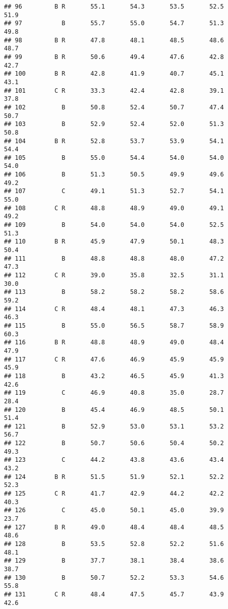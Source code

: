 \documentclass[]{article}
\begin{document}
\begin{verbatim}
## 96         B R       55.1       54.3       53.5       52.5       51.9
## 97           B       55.7       55.0       54.7       51.3       49.8
## 98         B R       47.8       48.1       48.5       48.6       48.7
## 99         B R       50.6       49.4       47.6       42.8       42.7
## 100        B R       42.8       41.9       40.7       45.1       43.1
## 101        C R       33.3       42.4       42.8       39.1       37.8
## 102          B       50.8       52.4       50.7       47.4       50.7
## 103          B       52.9       52.4       52.0       51.3       50.8
## 104        B R       52.8       53.7       53.9       54.1       54.4
## 105          B       55.0       54.4       54.0       54.0       54.0
## 106          B       51.3       50.5       49.9       49.6       49.2
## 107          C       49.1       51.3       52.7       54.1       55.0
## 108        C R       48.8       48.9       49.0       49.1       49.2
## 109          B       54.0       54.0       54.0       52.5       51.3
## 110        B R       45.9       47.9       50.1       48.3       50.4
## 111          B       48.8       48.8       48.0       47.2       47.3
## 112        C R       39.0       35.8       32.5       31.1       30.0
## 113          B       58.2       58.2       58.2       58.6       59.2
## 114        C R       48.4       48.1       47.3       46.3       46.3
## 115          B       55.0       56.5       58.7       58.9       60.3
## 116        B R       48.8       48.9       49.0       48.4       47.9
## 117        C R       47.6       46.9       45.9       45.9       45.9
## 118          B       43.2       46.5       45.9       41.3       42.6
## 119          C       46.9       40.8       35.0       28.7       28.4
## 120          B       45.4       46.9       48.5       50.1       51.4
## 121          B       52.9       53.0       53.1       53.2       56.7
## 122          B       50.7       50.6       50.4       50.2       49.3
## 123          C       44.2       43.8       43.6       43.4       43.2
## 124        B R       51.5       51.9       52.1       52.2       52.3
## 125        C R       41.7       42.9       44.2       42.2       40.3
## 126          C       45.0       50.1       45.0       39.9       23.7
## 127        B R       49.0       48.4       48.4       48.5       48.6
## 128          B       53.5       52.8       52.2       51.6       48.1
## 129          B       37.7       38.1       38.4       38.6       38.7
## 130          B       50.7       52.2       53.3       54.6       55.8
## 131        C R       48.4       47.5       45.7       43.9       42.6

\end{verbatim}
\end{document}
